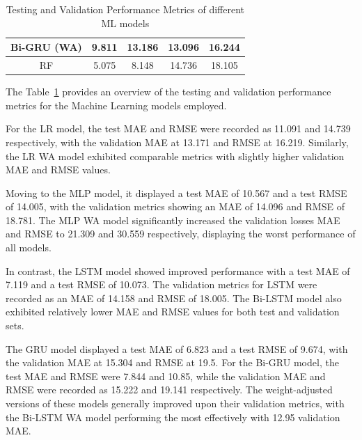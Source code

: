 \begin{table}[p]
\begin{center}
\begin{tabular}{ |c|c|c|c|c| }
            \hline
            Bi-GRU (WA)  & 9.811                     & 13.186                     & \cellcolor{green!20}13.096 & \cellcolor{green!20}16.244 \\
            \hline
            RF           & \cellcolor{green!30}5.075 & \cellcolor{green!30}8.148  & 14.736                     & 18.105                     \\
            \hline
        \end{tabular}
    \end{center}
    \captionsetup{format=plain, justification=centering, font=small}
    \caption{Testing and Validation Performance Metrics of different ML models}
    \label{tab:test_validate_rmse_mae}
\end{table}

\vspace{0.2cm}

The Table~\ref{tab:test_validate_rmse_mae} provides an overview of the testing and validation performance metrics for the Machine Learning models employed.

For the LR model, the test MAE and RMSE were recorded as 11.091 and 14.739 respectively, with the validation MAE at 13.171 and RMSE at 16.219.
Similarly, the LR WA model exhibited comparable metrics with slightly higher validation MAE and RMSE values.

Moving to the MLP model, it displayed a test MAE of 10.567 and a test RMSE of 14.005, with the validation metrics showing an MAE of 14.096 and RMSE of 18.781.
The MLP WA model significantly increased the validation losses MAE and RMSE to 21.309 and 30.559 respectively, displaying the worst performance of all models.

In contrast, the LSTM model showed improved performance with a test MAE of 7.119 and a test RMSE of 10.073.
The validation metrics for LSTM were recorded as an MAE of 14.158 and RMSE of 18.005.
The Bi-LSTM model also exhibited relatively lower MAE and RMSE values for both test and validation sets.

The GRU model displayed a test MAE of 6.823 and a test RMSE of 9.674, with the validation MAE at 15.304 and RMSE at 19.5.
For the Bi-GRU model, the test MAE and RMSE were 7.844 and 10.85, while the validation MAE and RMSE were recorded as 15.222 and 19.141 respectively.
The weight-adjusted versions of these models generally improved upon their validation metrics, with the Bi-LSTM WA model performing the most effectively with 12.95 validation MAE\@.

